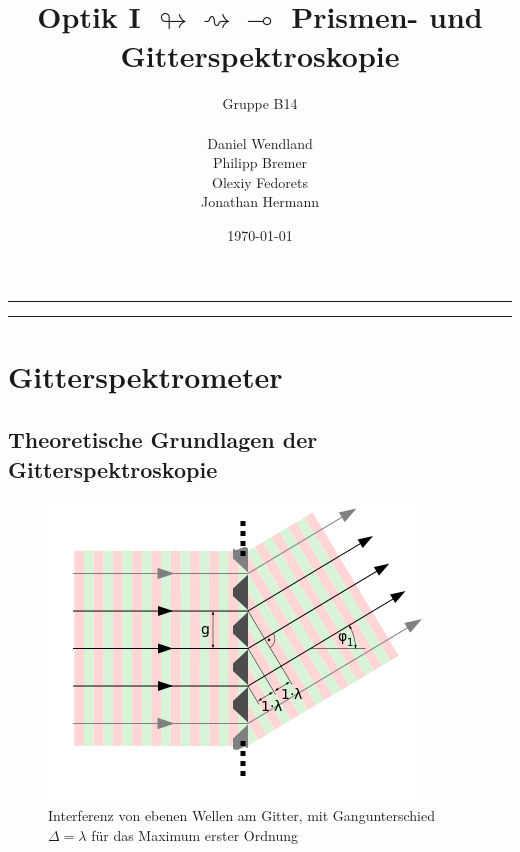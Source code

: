 \documentclass[a4paper, 11pt]{article}
\title{Optik I $\looparrowright\rightsquigarrow\multimap$ Prismen- und Gitterspektroskopie}
\author{Gruppe B14 \\ \\ Daniel Wendland \\ Philipp Bremer \\ Olexiy Fedorets \\ Jonathan Hermann}
\date{\today}
\begin{document}
\begin{titlepage}
\vspace*{\fill}
\begin{center}
	\vfill
	\newcommand{\Line}{\rule{\linewidth}{0.6mm}}
	\Line 
	{\let\newpage\relax\maketitle}
	\Line 
	\vfill
\end{center}
\vspace*{\fill}
\thispagestyle{empty}
\end{titlepage}





\newpage
\thispagestyle{empty}
\tableofcontents
\newpage

\pagestyle{fancy}
\fancyhf{}
\fancyhead[L]{\nouppercase{\leftmark}}
\fancyhead[R]{\thepage}
\renewcommand{\headrulewidth}{0.5pt}
\fancyfoot[C]{\thepage}


\setcounter{page}{1}

\section{Gitterspektrometer}

\subsection{Theoretische Grundlagen der Gitterspektroskopie}

\begin{figure}[H]
	\centering
	\includegraphics[scale=0.8]{./Bilder/Beugungsgitter-erstes-Maximum.png}
	\caption{Interferenz von ebenen Wellen am Gitter, mit Gangunterschied $\Delta=\lambda$ für das Maximum erster Ordnung \protect \footnotemark}
	\label{pic:Gitter}	
\end{figure}
\end{document}
